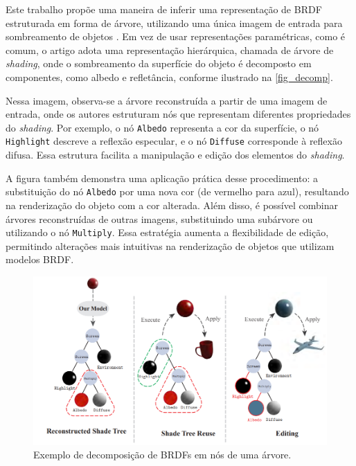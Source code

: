 Este trabalho propõe uma maneira de inferir uma representação de BRDF  estruturada em forma de árvore, utilizando uma única imagem de entrada para sombreamento de objetos \cite{tree_decomposition}. Em vez de usar representações paramétricas, como é comum, o artigo adota uma representação hierárquica, chamada de árvore de \textit{shading}, onde o sombreamento da superfície do objeto é decomposto em componentes, como albedo e refletância, conforme ilustrado na \autoref{fig_decomp}.

Nessa imagem, observa-se a árvore reconstruída a partir de uma imagem de entrada, onde os autores estruturam nós que representam diferentes propriedades do \textit{shading}. Por exemplo, o nó \texttt{Albedo} representa a cor da superfície, o nó \texttt{Highlight} descreve a reflexão especular, e o nó \texttt{Diffuse} corresponde à reflexão difusa. Essa estrutura facilita a manipulação e edição dos elementos do \textit{shading}.

A figura também demonstra uma aplicação prática desse procedimento: a substituição do nó \texttt{Albedo} por uma nova cor (de vermelho para azul), resultando na renderização do objeto com a cor alterada. Além disso, é possível combinar árvores reconstruídas de outras imagens, substituindo uma subárvore ou utilizando o nó \texttt{Multiply}. Essa estratégia aumenta a flexibilidade de edição, permitindo alterações mais intuitivas na renderização de objetos que utilizam modelos BRDF.

\begin{figure}[H]
        \caption{\label{fig_decomp} \small Exemplo de decomposição de BRDFs em nós de uma árvore.}
        \begin{center}
            \includegraphics[scale=0.5]{./Imagens/tree-shading.png}
        \end{center}
\end{figure}




